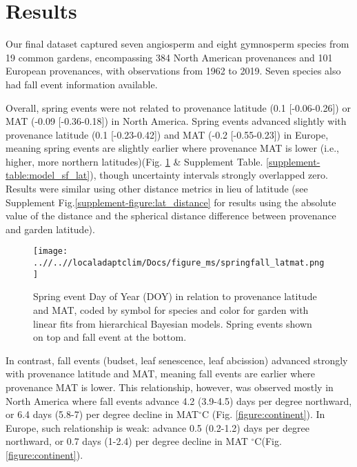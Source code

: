 \documentclass{article}
\begin{document}
\section{Results}
Our final dataset captured seven angiosperm and eight gymnosperm species from 19 common gardens, encompassing 384 North American provenances and 101 European provenances, with observations from 1962 to 2019. Seven species also had fall event information available. 
\\



Overall, spring events were not related to provenance latitude (0.1 [-0.06-0.26]) or MAT (-0.09 [-0.36-0.18]) in North America.  Spring events advanced slightly with provenance latitude (0.1 [-0.23-0.42]) and MAT (-0.2 [-0.55-0.23]) in Europe, meaning spring events are slightly earlier where provenance MAT is lower (i.e., higher, more northern latitudes)(Fig. \ref{figure:springfall_latmat} \& Supplement Table. \ref{supplement-table:model_sf_lat}), though uncertainty intervals strongly overlapped zero. Results were similar using other distance metrics in lieu of latitude (see Supplement Fig.\ref{supplement-figure:lat_distance} for results using the absolute value of the distance and the spherical distance difference between provenance and garden latitude). 

\begin{figure}[!h] 
    \centering
 \texttt{[image: ..//..//localadaptclim/Docs/figure\_ms/springfall\_latmat.png]}
    \caption{Spring event Day of Year (DOY) in relation to provenance latitude and MAT, coded by symbol for species and color for garden with linear fits from hierarchical Bayesian models. Spring events shown on top and fall event at the bottom.} 
    \label{figure:springfall_latmat}
\end{figure}


In contrast, fall events (budset, leaf senescence, leaf abcission) advanced strongly with provenance latitude and MAT, meaning fall events are earlier where provenance MAT is lower. This relationship, however, was observed mostly in North America where fall events advance 4.2 (3.9-4.5) days per degree northward, or 6.4 days (5.8-7) per degree decline in MAT$^{\circ}$C (Fig. \ref{figure:continent}). In Europe, such relationship is weak: advance 0.5 (0.2-1.2) days per degree northward, or 0.7 days (1-2.4) per degree decline in MAT $^{\circ}$C(Fig. \ref{figure:continent}). 
\end{document}
